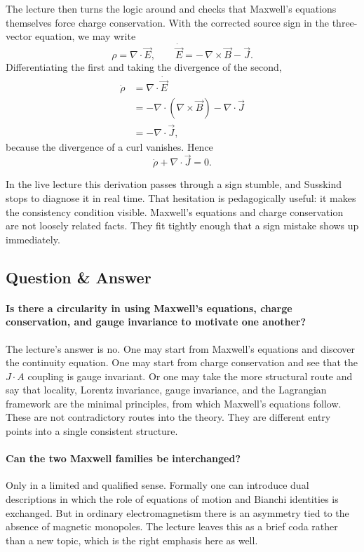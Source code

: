 The lecture then turns the logic around and checks that Maxwell's equations themselves force charge conservation. With the corrected source sign in the three-vector equation, we may write
\begin{equation}
\rho=\nabla\cdot \vec E,
\qquad
\dot{\vec E}=-\,\nabla\times \vec B-\vec J.
\end{equation}
Differentiating the first and taking the divergence of the second,
\begin{align}
\dot\rho
&=
\nabla\cdot \dot{\vec E}
\\
&=
-\nabla\cdot(\nabla\times \vec B)-\nabla\cdot \vec J
\\
&=
-\nabla\cdot \vec J,
\end{align}
because the divergence of a curl vanishes. Hence
\begin{equation}
\dot\rho+\nabla\cdot \vec J=0.
\end{equation}

\begin{remark}
In the live lecture this derivation passes through a sign stumble, and Susskind stops to diagnose it in real time. That hesitation is pedagogically useful: it makes the consistency condition visible. Maxwell's equations and charge conservation are not loosely related facts. They fit tightly enough that a sign mistake shows up immediately.
\end{remark}

\subsection{Question \& Answer}

\paragraph{Is there a circularity in using Maxwell's equations, charge conservation, and gauge invariance to motivate one another?}
The lecture's answer is no. One may start from Maxwell's equations and discover the continuity equation. One may start from charge conservation and see that the \(J\cdot A\) coupling is gauge invariant. Or one may take the more structural route and say that locality, Lorentz invariance, gauge invariance, and the Lagrangian framework are the minimal principles, from which Maxwell's equations follow. These are not contradictory routes into the theory. They are different entry points into a single consistent structure.

\paragraph{Can the two Maxwell families be interchanged?}
Only in a limited and qualified sense. Formally one can introduce dual descriptions in which the role of equations of motion and Bianchi identities is exchanged. But in ordinary electromagnetism there is an asymmetry tied to the absence of magnetic monopoles. The lecture leaves this as a brief coda rather than a new topic, which is the right emphasis here as well.


